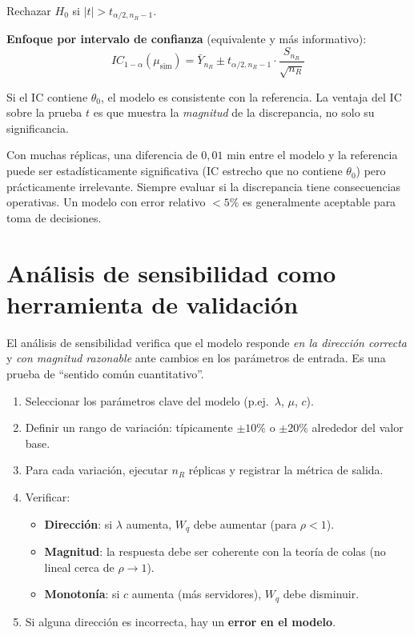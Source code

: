 \documentclass[11pt, letterpaper]{article}
\begin{document}
Rechazar $H_0$ si $|t| > t_{\alpha/2, n_R-1}$.

\textbf{Enfoque por intervalo de confianza} (equivalente y más informativo):
\[
IC_{1-\alpha}(\mu_{\text{sim}}) = \bar Y_{n_R} \pm t_{\alpha/2, n_R-1} \cdot \frac{S_{n_R}}{\sqrt{n_R}}
\]

Si el IC contiene $\theta_0$, el modelo es consistente con la referencia. La ventaja del IC sobre la prueba $t$ es que muestra la \emph{magnitud} de la discrepancia, no solo su significancia.

\begin{alertabox}
Con muchas réplicas, una diferencia de $0{,}01$ min entre el modelo y la referencia puede ser estadísticamente significativa (IC estrecho que no contiene $\theta_0$) pero prácticamente irrelevante. Siempre evaluar si la discrepancia tiene consecuencias operativas. Un modelo con error relativo $< 5\%$ es generalmente aceptable para toma de decisiones.
\end{alertabox}

\section{Análisis de sensibilidad como herramienta de validación}

El análisis de sensibilidad verifica que el modelo responde \emph{en la dirección correcta} y \emph{con magnitud razonable} ante cambios en los parámetros de entrada. Es una prueba de ``sentido común cuantitativo''.

\begin{metodobox}
\begin{enumerate}
    \item Seleccionar los parámetros clave del modelo (p.ej.\ $\lambda$, $\mu$, $c$).
    \item Definir un rango de variación: típicamente $\pm 10\%$ o $\pm 20\%$ alrededor del valor base.
    \item Para cada variación, ejecutar $n_R$ réplicas y registrar la métrica de salida.
    \item Verificar:
    \begin{itemize}
        \item \textbf{Dirección}: si $\lambda$ aumenta, $W_q$ debe aumentar (para $\rho < 1$).
        \item \textbf{Magnitud}: la respuesta debe ser coherente con la teoría de colas (no lineal cerca de $\rho \to 1$).
        \item \textbf{Monotonía}: si $c$ aumenta (más servidores), $W_q$ debe disminuir.
    \end{itemize}
    \item Si alguna dirección es incorrecta, hay un \textbf{error en el modelo}.
\end{enumerate}
\end{metodobox}
\end{document}
